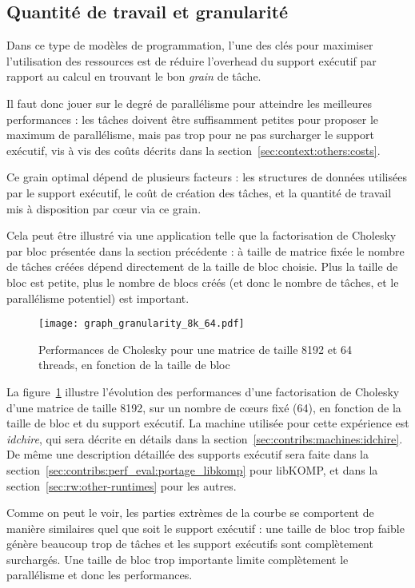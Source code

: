 \subsection{Quantité de travail et granularité}\label{sec:context:others:granularity}


Dans ce type de modèles de programmation, l'une des clés pour maximiser l'utilisation des ressources est de réduire l'overhead du support exécutif par rapport au calcul en trouvant le bon \emph{grain} de tâche.

Il faut donc jouer sur le degré de parallélisme pour atteindre les meilleures performances : les tâches doivent être suffisamment petites pour proposer le maximum de parallélisme, mais pas trop pour ne pas surcharger le support exécutif, vis à vis des coûts décrits dans la section~\ref{sec:context:others:costs}.

Ce grain optimal dépend de plusieurs facteurs : les structures de données utilisées par le support exécutif, le coût de création des tâches, et la quantité de travail mis à disposition par cœur via ce grain.

Cela peut être illustré via une application telle que la factorisation de Cholesky par bloc présentée dans la section précédente : à taille de matrice fixée le nombre de tâches créées dépend directement de la taille de bloc choisie.
Plus la taille de bloc est petite, plus le nombre de blocs créés (et donc le nombre de tâches, et le parallélisme potentiel) est important.

\begin{figure}[ht]
  \centering
  \texttt{[image: graph\_granularity\_8k\_64.pdf]}
  \caption{Performances de Cholesky pour une matrice de taille 8192 et 64 threads, en fonction de la taille de bloc}\label{fig:context:granularity}
\end{figure}

La figure~\ref{fig:context:granularity} illustre l'évolution des performances d'une factorisation de Cholesky d'une matrice de taille 8192, sur un nombre de cœurs fixé (64), en fonction de la taille de bloc et du support exécutif.
La machine utilisée pour cette expérience est \emph{idchire}, qui sera décrite en détails dans la section~\ref{sec:contribs:machines:idchire}.
De même une description détaillée des supports exécutif sera faite dans la section~\ref{sec:contribs:perf_eval:portage_libkomp} pour libKOMP, et dans la section~\ref{sec:rw:other-runtimes} pour les autres.

Comme on peut le voir, les parties extrèmes de la courbe se comportent de manière similaires quel que soit le support exécutif : une taille de bloc trop faible génère beaucoup trop de tâches et les support exécutifs sont complètement surchargés. Une taille de bloc trop importante limite complètement le parallélisme et donc les performances.

